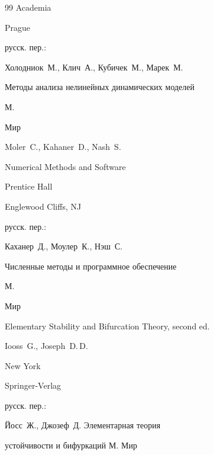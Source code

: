 \begin{thebibliography}{99}
\publ Academia

\publaddr Prague


\rtransl русск. пер.:~

\by Холодниок~М., Клич~А., Кубичек~М., Марек~М.

\book Методы анализа нелинейных динамических моделей 

\publaddr М.

\publ Мир 






\by Moler~C., Kahaner~D., Nash~S.

\book Numerical Methods and Software


\publ Prentice Hall 

\publaddr Englewood Cliffs, NJ


\rtransl русск. пер.:~

\by Каханер~Д., Моулер~К., Нэш~С. 

\book Численные методы и программное обеспечение 

\publaddr М. 

\publ Мир 






\book Elementary Stability and Bifurcation Theory, second ed.\nofrills 

\by Iooss~G., Joseph~D.\,D.


\publaddr New York

\publ Springer-Verlag

\rtransl русск. пер.:~

\by Йосс~Ж., Джозеф~Д. \book Элементарная теория

устойчивости и бифуркаций \publaddr М. \publ Мир 







\end{thebibliography}




%





\makeengtitle



\newpage



%

